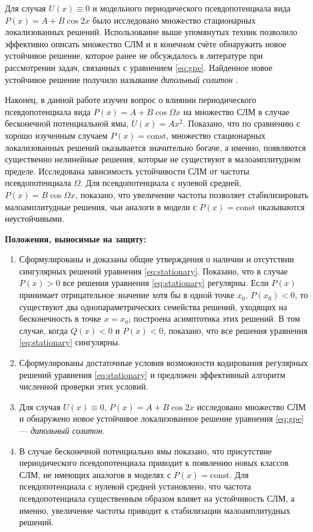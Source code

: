 \documentclass[candidate, href, colorlinks]{disser}
\begin{document}
Для случая $U(x) \equiv 0$ и модельного периодического псевдопотенциала вида $P(x) = A + B \cos 2x$ было исследовано множество стационарных локализованных решений.
Использование выше упомянутых техник позволило эффективно описать множество СЛМ и в конечном счёте обнаружить новое устойчивое решение, которое ранее не обсуждалось в литературе при рассмотрении задач, связанных с уравнением \eqref{eq:gpe}.
Найденное новое устойчивое решение получило называние {\it дипольный солитон} \cite{LebedevAlfimovMalomed}.

Наконец, в данной работе изучен вопрос о влиянии периодического псевдопотенциала вида $P(x) = A + B \cos \Omega x$ на множество СЛМ в случае бесконечной потенциальной ямы, $U(x) = A x^2$.
Показано, что по сравнению с хорошо изученным случаем $P(x) = \mathrm{const}$, множество стационарных локализованных решений оказывается значительно богаче, а именно, появляются существенно нелинейные решения, которые не существуют в малоамплитудном пределе.
Исследована зависимость устойчивости СЛМ от частоты псевдопотенциала $\Omega$.
Для псевдопотенциала с нулевой средней, $P(x) = B \cos \Omega x$, показано, что увеличение частоты позволяет стабилизировать малоамплитудные решения, чьи аналоги в модели с $P(x) = \mathrm{const}$ оказываются неустойчивыми.


\textbf{Положения, выносимые на защиту:}
\begin{enumerate}
	\item Сформулированы и доказаны общие утверждения о наличии и отсутствии сингулярных решений уравнения \eqref{eq:stationary}.
		Показано, что в случае $P(x) > 0$ все решения уравнения \eqref{eq:stationary} регулярны.
		Если $P(x)$ принимает отрицательное значение хотя бы в одной точке $x_0$, $P(x_0) < 0$, то существуют два однопараметрических семейства решений, уходящих на бесконечность в точке $x = x_0$; построена асимптотика этих решений. 
		В том случае, когда $Q(x) < 0$ и $P(x) < 0$, показано, что все решения уравнения \eqref{eq:stationary} сингулярны.
	\item Сформулированы достаточные условия возможности кодирования регулярных решений уравнения \eqref{eq:stationary} и предложен эффективный алгоритм численной проверки этих условий.
	\item Для случая $U(x) \equiv 0$, $P(x) = A + B \cos 2x$ исследовано множество СЛМ и обнаружено новое устойчивое локализованное решение уравнения \eqref{eq:gpe} --- {\it дипольный солитон}.
	\item В случае бесконечной потенциально ямы показано, что присутствие периодического псевдопотенциала приводит к появлению новых классов СЛМ, не имеющих аналогов в моделях с $P(x) = \mathrm{const}$.
		Для псевдопотенциала с нулевой средней установлено, что частота псевдопотенциала существенным образом влияет на устойчивость СЛМ, а именно, увеличение частоты приводит к стабилизации малоамплитудных решений.
\end{enumerate}
\end{document}
